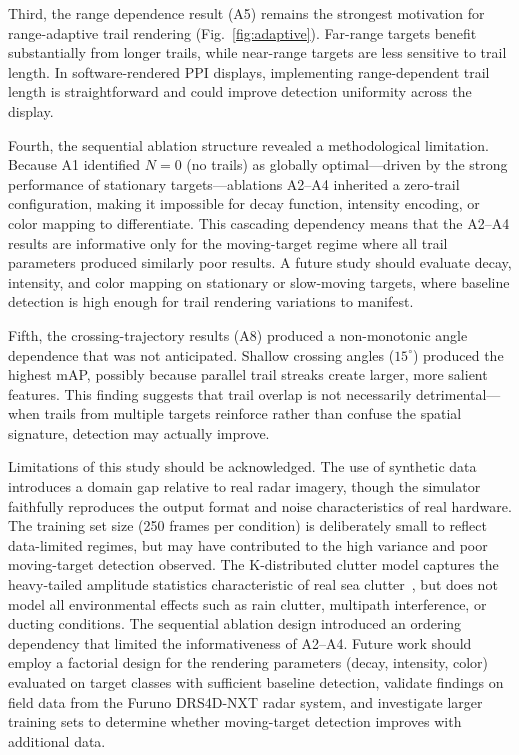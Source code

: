 \documentclass[colorlinks,upint,balance]{asmeconf}
\begin{document}
Third, the range dependence result (A5) remains the strongest motivation for range-adaptive trail rendering (Fig.~\ref{fig:adaptive}). Far-range targets benefit substantially from longer trails, while near-range targets are less sensitive to trail length. In software-rendered PPI displays, implementing range-dependent trail length is straightforward and could improve detection uniformity across the display.

Fourth, the sequential ablation structure revealed a methodological limitation. Because A1 identified $N=0$ (no trails) as globally optimal---driven by the strong performance of stationary targets---ablations A2--A4 inherited a zero-trail configuration, making it impossible for decay function, intensity encoding, or color mapping to differentiate. This cascading dependency means that the A2--A4 results are informative only for the moving-target regime where all trail parameters produced similarly poor results. A future study should evaluate decay, intensity, and color mapping on stationary or slow-moving targets, where baseline detection is high enough for trail rendering variations to manifest.

Fifth, the crossing-trajectory results (A8) produced a non-monotonic angle dependence that was not anticipated. Shallow crossing angles ($15^\circ$) produced the highest mAP, possibly because parallel trail streaks create larger, more salient features. This finding suggests that trail overlap is not necessarily detrimental---when trails from multiple targets reinforce rather than confuse the spatial signature, detection may actually improve.

Limitations of this study should be acknowledged. The use of synthetic data introduces a domain gap relative to real radar imagery, though the simulator faithfully reproduces the output format and noise characteristics of real hardware. The training set size (250 frames per condition) is deliberately small to reflect data-limited regimes, but may have contributed to the high variance and poor moving-target detection observed. The K-distributed clutter model captures the heavy-tailed amplitude statistics characteristic of real sea clutter~\cite{Ward2013Marine}, but does not model all environmental effects such as rain clutter, multipath interference, or ducting conditions. The sequential ablation design introduced an ordering dependency that limited the informativeness of A2--A4. Future work should employ a factorial design for the rendering parameters (decay, intensity, color) evaluated on target classes with sufficient baseline detection, validate findings on field data from the Furuno DRS4D-NXT radar system, and investigate larger training sets to determine whether moving-target detection improves with additional data.
\end{document}
